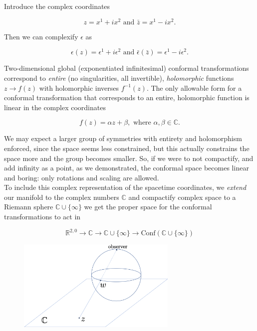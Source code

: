 \documentclass[10pt]{article}
\begin{document}
\noindent Introduce the complex coordinates

\begin{equation}
z = x^1 + i x^2 \text{ and } \bar{z} = x^1 - i x^2.
\end{equation}

\noindent Then we can complexify $\epsilon$ as

\begin{equation}
\epsilon(z) = \epsilon^1 + i \epsilon^2 \text{ and } \bar{\epsilon}({\bar{z}}) = \epsilon^1 - i \epsilon^2.
\end{equation}

\noindent Two-dimensional global (exponentiated infinitesimal) conformal transformations correspond to \textit{entire} (no singularities, all invertible), \textit{holomorphic} functions $z \rightarrow f(z)$ with holomorphic inverses $f^{-1} (z)$. The only allowable form for a conformal transformation that corresponds to an entire, holomorphic function is linear in the complex coordinates

\begin{equation}
f(z) = \alpha z + \beta, \text{ where } \alpha, \beta \in \mathbb{C}.
\end{equation}

\noindent We may expect a larger group of symmetries with entirety and holomorphism enforced, since the space seems less constrained, but this actually constrains the space more and the group becomes smaller. So, if we were to not compactify, and add infinity as a point, as we demonstrated, the conformal space becomes linear and boring: only rotations and scaling are allowed.\\

\noindent To include this complex representation of the spacetime coordinates, we \textit{extend} our manifold to the complex numbers $\mathbb{C}$ and compactify complex space to a Riemann sphere $\mathbb{C} \cup \{ \infty \}$ we get the proper space for the conformal transformations to act in

\begin{equation}
\mathbb{R}^{2,0} \rightarrow \mathbb{C} \rightarrow \mathbb{C} \cup \{\infty\} \rightarrow \text{Conf}(\mathbb{C} \cup \{\infty\} )
\end{equation}

\begin{figure}[H]
	\centering
	\includegraphics[width=3in]{images/riemann_sphere.png} 
\end{figure} 
\end{document}
